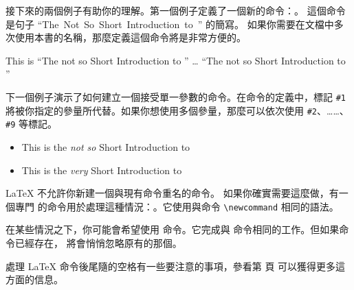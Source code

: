 接下來的兩個例子有助你的理解。第一個例子定義了一個新的命令：。
這個命令是句子 ``The\ Not\ So\ Short\ Introduction\ to\ \LaTeXe'' 的簡寫。
如果你需要在文檔中多次使用本書的名稱，那麼定義這個命令將是非常方便的。

\begin{example}
\newcommand{\tnss}{The not
    so Short Introduction to
    \LaTeXe}
This is ``\tnss'' \ldots{}
``\tnss''
\end{example}

下一個例子演示了如何建立一個接受單一參數的命令。在命令的定義中，標記 \verb|#1| 
將被你指定的參量所代替。如果你想使用多個參量，那麼可以依次使用 \verb|#2|、……、
\verb|#9| 等標記。

\begin{example}
\newcommand{\txsit}[1]
 {This is the \emph{#1} Short
      Introduction to \LaTeXe}
\begin{itemize}
\item \txsit{not so}
\item \txsit{very}
\end{itemize}
\end{example}

\LaTeX{} 不允許你新建一個與現有命令重名的命令。 如果你確實需要這麼做，有一個專門
的命令用於處理這種情況：。它使用與命令 \verb|\newcommand| 
相同的語法。

在某些情況之下，你可能會希望使用  命令。它完成與  
命令相同的工作。但如果命令已經存在，\LaTeXe{} 將會悄悄忽略原有的那個。

處理 \LaTeX{} 命令後尾隨的空格有一些要注意的事項，參看第 \pageref{whitespace} 頁
可以獲得更多這方面的信息。

